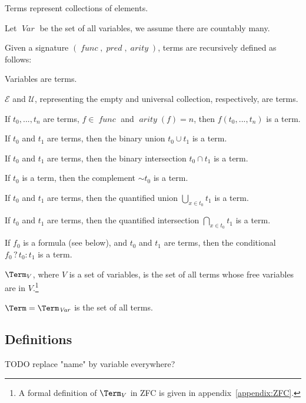 \documentclass[oneside,12pt]{book}
\theoremstyle{definition}
\theoremstyle{remark}
\newcommand\var[1]{\mathop{\mathit{#1}}\nolimits}
\newcommand{\Var}{\var{Var}}
\newcommand{\conditional}[3]{#1 \mathrel{?} #2 : #3}
\newcommand{\Empty}{\mathcal{E}}
\newcommand{\Universal}{\mathcal{U}}
\newcommand{\func}{\var{func}}
\newcommand{\pred}{\var{pred}}
\newcommand{\arity}{\var{arity}}
\begin{document}
\noindent Terms represent collections of elements.

\begin{defBox}
  Let $\Var$ be the set of all variables, we assume there are countably many.
\end{defBox}

\noindent Given a signature $(\func, \pred, \arity)$, terms are
recursively defined as follows:

\begin{compactenum}
  \item Variables are terms.
  \item $\Empty$ and $\Universal$, representing the empty and universal collection,
    respectively, are terms.
  \item If $t_0, ..., t_n$ are terms, $f \in \func$ and $\arity(f) = n$,
    then $f(t_0, ..., t_n)$ is a term.
  \item If $t_0$ and $t_1$ are terms, then the binary union $t_0 \cup t_1$ is a term.
  \item If $t_0$ and $t_1$ are terms, then the binary intersection $t_0 \cap t_1$ is a term.
  \item If $t_0$ is a term, then the complement $\sim t_0$ is a term.
  \item If $t_0$ and $t_1$ are terms, then the quantified union
    $\displaystyle \bigcup_{x \in t_0} t_1$ is a term.
  \item If $t_0$ and $t_1$ are terms, then the quantified intersection
    $\displaystyle \bigcap_{x \in t_0} t_1$ is a term.
  \item If $f_0$ is a formula (see below), and $t_0$ and $t_1$ are terms,
    then the conditional $\conditional{f_0}{t_0}{t_1}$ is a term.
\end{compactenum}

\begin{defBox}
  $\Term_V$, where $V$ is a set of variables, is the set of all
  terms whose free variables are in $V$.\footnote{A formal definition of
  $\Term_V$ in ZFC is given in appendix~\ref{appendix:ZFC}.}
  
  \medskip \noindent $\Term = \Term_{\Var}$ is the set of all terms.
\end{defBox}

\subsection{Definitions}

TODO replace "name" by variable everywhere?
\end{document}
